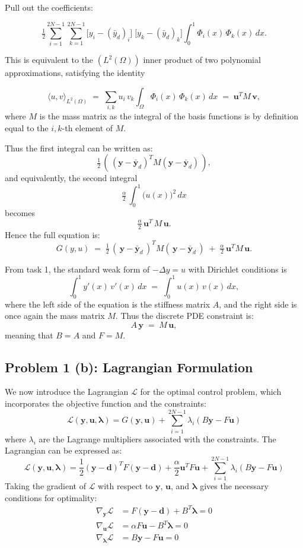 \documentclass[a4paper,10pt]{article}
\begin{document}
\noindent
Pull out the coefficients:

\[
\tfrac12
\sum_{i=1}^{2N-1}\sum_{k=1}^{2N-1}
\bigl[y_{i} - (\bar{y}_{d})_{i}\bigr]\;\bigl[y_{k} - (\bar{y}_{d})_{k}\bigr]
\int_{0}^{1}\Phi_{i}(x)\,\Phi_{k}(x)\,dx.
\]

\noindent
This is equivalent to the $(L^2(\Omega))$ inner product of two polynomial approximations, satisfying the identity

\[
\langle u,v\rangle_{L^2(\Omega)}
\;=\;
\sum_{i,k} u_{i}\,v_{k}\int_{\Omega}\Phi_{i}(x)\,\Phi_{k}(x)\,dx
\;=\;
\mathbf{u}^{T}M\,\mathbf{v},
\]
where $M$ is the mass matrix as the integral of the basis functions is by definition equal to the $i,k$-th
element of $M$.

\medskip

\noindent
Thus the first integral can be written as:
\[
\tfrac12\,(\,(\mathbf{y}-\bar{\mathbf{y}}_{d})^{T}M(\mathbf{y}-\bar{\mathbf{y}}_{d})\,),
\]
and equivalently, the second integral
\[
\tfrac{\alpha}{2}\,\int_{0}^{1}\bigl(u(x)\bigr)^{2}\,dx
\]
becomes
\[
\tfrac{\alpha}{2}\,\mathbf{u}^{T}\,M\,\mathbf{u}.
\]
Hence the full equation is:
\[
G(y,u)
\;=\;
\tfrac12\,(\,\mathbf{y}-\bar{\mathbf{y}}_{d}\,)^{T}M(\,\mathbf{y}-\bar{\mathbf{y}}_{d}\,)
\;+\;
\tfrac{\alpha}{2}\,\mathbf{u}^{T}M\,\mathbf{u}.
\]

\bigskip

\noindent
From task 1, the standard weak form of $-\Delta y = u$ with Dirichlet conditions is
\[
\int_{0}^{1}y'(x)\,v'(x)\,dx
\;=\;
\int_{0}^{1}u(x)\,v(x)\,dx,
\]
where the left side of the equation is the stiffness matrix $A$, and the right side is once again the mass matrix $M$.
Thus the discrete PDE constraint is:
\[
A\,\mathbf{y}\;=\;M\,\mathbf{u},
\]
meaning that $B = A$ and $F = M$.

\subsection{Problem 1 (b): Lagrangian Formulation}
We now introduce the Lagrangian \(\mathcal{L}\) for the optimal control problem, which incorporates the objective function and the constraints:
\[
	\mathcal{L}(\mathbf{y},\mathbf{u},\mathbf{\lambda}) = G(\mathbf{y},\mathbf{u}) + \sum_{i=1}^{2N-1} \lambda_i \left( B \mathbf{y} - F \mathbf{u} \right)
\]
where \(\lambda_i\) are the Lagrange multipliers associated with the constraints.
The Lagrangian can be expressed as:
\[
	\mathcal{L}(\mathbf{y},\mathbf{u},\mathbf{\lambda}) = \frac{1}{2}(\mathbf{y}-\mathbf{d})^T F (\mathbf{y}-\mathbf{d}) + \frac{\alpha}{2} \mathbf{u}^T F \mathbf{u} + \sum_{i=1}^{2N-1} \lambda_i \left( B \mathbf{y} - F \mathbf{u} \right)
\]
Taking the gradient of \(\mathcal{L}\) with respect to \(\mathbf{y}\), \(\mathbf{u}\), and \(\mathbf{\lambda}\) gives the necessary conditions for optimality:
\begin{align*}
	\nabla_{\mathbf{y}} \mathcal{L} &= F(\mathbf{y}-\mathbf{d}) + B^T \mathbf{\lambda} = 0 \\
	\nabla_{\mathbf{u}} \mathcal{L} &= \alpha F \mathbf{u} - B^T \mathbf{\lambda} = 0 \\
	\nabla_{\mathbf{\lambda}} \mathcal{L} &= B \mathbf{y} - F \mathbf{u} = 0
\end{align*}
\end{document}
